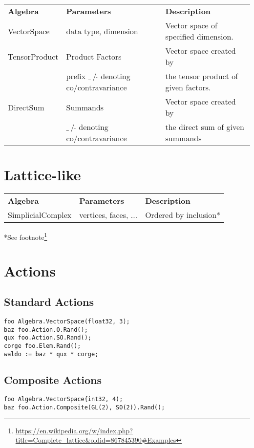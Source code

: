\documentclass{amsbook}
\begin{document}
\begin{tabular}{lll}
  \textbf{Algebra} & \textbf{Parameters} & \textbf{Description} \\
  VectorSpace & data type, dimension & Vector space of specified dimension.\\
  TensorProduct & Product Factors & Vector space created by \\
  & prefix $\_~/~\hat{}$  denoting co/contravariance & the tensor product of given factors.\\
  DirectSum & Summands & Vector space created by \\
   & $\_~/~\hat{}$  denoting co/contravariance & the direct sum of given summands\\
\end{tabular}

\section{Lattice-like}

\begin{tabular}{lll}
  \textbf{Algebra} & \textbf{Parameters} & \textbf{Description} \\
  SimplicialComplex & vertices, faces, ... & Ordered by inclusion*
\end{tabular}

*See footnote\footnote{\url{https://en.wikipedia.org/w/index.php?title=Complete_lattice&oldid=867845390\#Examples}}

\section{Actions}

\subsection{Standard Actions}

\begin{verbatim}
foo Algebra.VectorSpace(float32, 3);
baz foo.Action.O.Rand();
qux foo.Action.SO.Rand();
corge foo.Elem.Rand();
waldo := baz * qux * corge;
\end{verbatim}

\subsection{Composite Actions}

\begin{verbatim}
foo Algebra.VectorSpace{int32, 4);
baz foo.Action.Composite(GL(2), SO(2)).Rand();
\end{verbatim}
\end{document}

